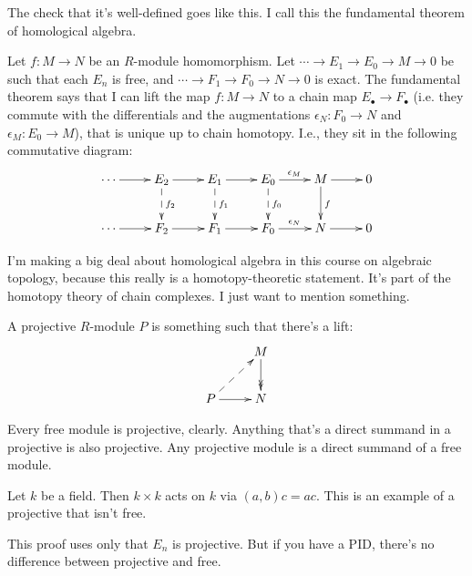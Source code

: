 The check that it's well-defined goes like this. I call this the fundamental theorem of homological algebra.
\begin{theorem}
Let $f:M\to N$ be an $R$-module homomorphism. Let $\cdots\to E_1\to E_0\to M\to 0$ be such that each $E_n$ is free, and $\cdots\to F_1\to F_0\to N\to 0$ is exact. The fundamental theorem says that I can lift the map $f:M\to N$ to a chain map $E_\bullet\to F_\bullet$ (i.e. they commute with the differentials and the augmentations $\epsilon_N:F_0\to N$ and $\epsilon_M:E_0\to M$), that is unique up to chain homotopy. I.e., they sit in the following commutative diagram:
\begin{equation*}
\xymatrix{\cdots\ar[r] & E_2\ar[r]\ar@{-->}[d]^{f_2} & E_1\ar[r]\ar@{-->}[d]^{f_1} & E_0\ar[r]^{\epsilon_M}\ar@{-->}[d]^{f_0} & M\ar[d]^f\ar[r] & 0\\
\cdots\ar[r] & F_2\ar[r] & F_1\ar[r] & F_0\ar[r]^{\epsilon_N} & N\ar[r] & 0}
\end{equation*}
\end{theorem}
I'm making a big deal about homological algebra in this course on algebraic topology, because this really is a homotopy-theoretic statement. It's part of the homotopy theory of chain complexes. I just want to mention something.
\begin{definition}
A projective $R$-module $P$ is something such that there's a lift:
\begin{equation*}
\xymatrix{ & M\ar@{->>}[d]\\
P\ar@{-->}[ur]\ar[r] & N}
\end{equation*}
\end{definition}
Every free module is projective, clearly. Anything that's a direct summand in a projective is also projective. Any projective module is a direct summand of a free module.
\begin{example}
Let $k$ be a field. Then $k\times k$ acts on $k$ via $(a,b)c=ac$. This is an example of a projective that isn't free.
\end{example}
\begin{remark}
This proof uses only that $E_n$ is projective. But if you have a PID, there's no difference between projective and free.
\end{remark}
